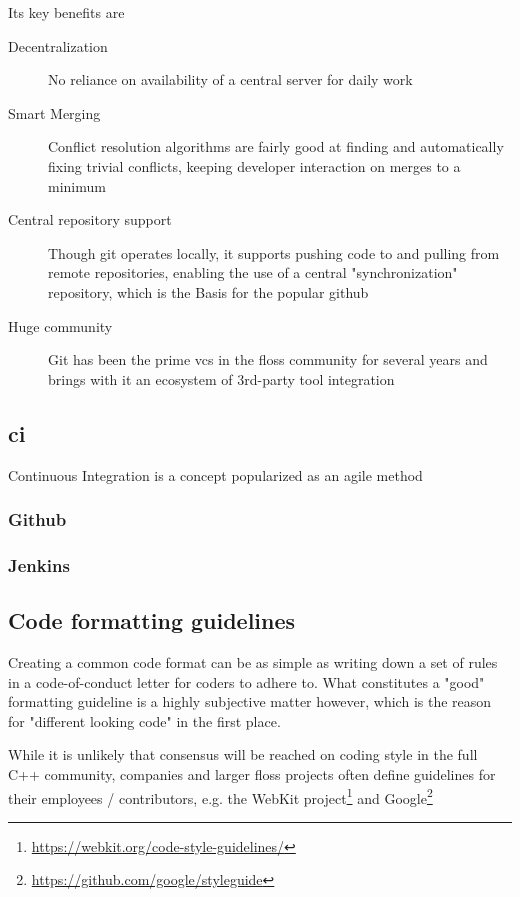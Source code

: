 Its key benefits are
\begin{description}
	\item[Decentralization] No reliance on availability of a central server for daily work
	\item[Smart Merging] Conflict resolution algorithms are fairly good at finding and automatically fixing trivial conflicts, keeping developer interaction on merges to a minimum
	\item[Central repository support] Though git operates locally, it supports pushing code to and pulling from remote repositories, enabling the use of a central "synchronization" repository, which is the Basis for the popular \gls{github} 
	\item [Huge community] Git has been the prime \gls{vcs} in the \gls{floss} community for several years and brings with it an ecosystem of 3rd-party tool integration 
\end{description}

\subsection{\gls{ci}}
Continuous Integration is a concept popularized as an \gls{agile} method
\subsubsection{Github}

\subsubsection{Jenkins}

\subsection{Code formatting guidelines}
Creating a common code format can be as simple as writing down a set of rules in a code-of-conduct letter for coders to adhere to. What constitutes a "good" formatting guideline is a highly subjective matter however, which is the reason for "different looking code" in the first place.

While it is unlikely that consensus will be reached on coding style in the full C++ community, companies and larger \gls{floss} projects often define guidelines for their employees / contributors,
e.g. the WebKit project\footnote{\url{https://webkit.org/code-style-guidelines/}} and Google\footnote{\url{https://github.com/google/styleguide}}

